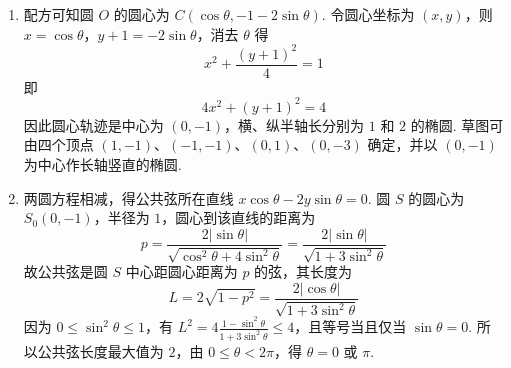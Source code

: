 \begin{solution}
\begin{enumerate}
\item 配方可知圆 \(O\) 的圆心为 \(C\left(\cos\theta,-1-2\sin\theta\right)\). 令圆心坐标为 \((x,y)\)，则 \(x=\cos\theta\)，\(y+1=-2\sin\theta\)，消去 \(\theta\) 得
\[
x^2+\frac{(y+1)^2}{4}=1
\]
即
\[
4x^2+(y+1)^2=4
\]
因此圆心轨迹是中心为 \((0,-1)\)，横、纵半轴长分别为 \(1\) 和 \(2\) 的椭圆. 草图可由四个顶点 \((1,-1)\)、\((-1,-1)\)、\((0,1)\)、\((0,-3)\) 确定，并以 \((0,-1)\) 为中心作长轴竖直的椭圆.

\item 两圆方程相减，得公共弦所在直线 \(x\cos\theta-2y\sin\theta=0\). 圆 \(S\) 的圆心为 \(S_0(0,-1)\)，半径为 \(1\)，圆心到该直线的距离为
\[
p=\frac{2|\sin\theta|}{\sqrt{\cos^2\theta+4\sin^2\theta}}=\frac{2|\sin\theta|}{\sqrt{1+3\sin^2\theta}}
\]
故公共弦是圆 \(S\) 中心距圆心距离为 \(p\) 的弦，其长度为
\[
L=2\sqrt{1-p^2}=\frac{2|\cos\theta|}{\sqrt{1+3\sin^2\theta}}
\]
因为 \(0\leqslant\sin^2\theta\leqslant1\)，有 \(L^2=4\frac{1-\sin^2\theta}{1+3\sin^2\theta}\leqslant4\)，且等号当且仅当 \(\sin\theta=0\). 所以公共弦长度最大值为 \(2\)，由 \(0\leqslant\theta<2\pi\)，得 \(\theta=0\) 或 \(\pi\).
\end{enumerate}
\end{solution}

